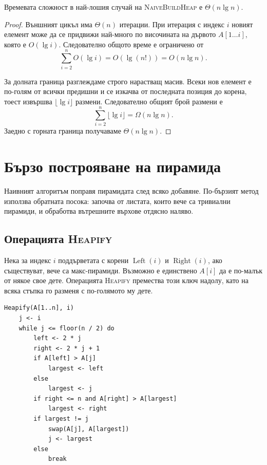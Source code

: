 \begin{thm}
Времевата сложност в най-лошия случай на \textsc{NaiveBuildHeap} е $\Theta(n\lg n)$.
\end{thm}

\begin{proof}
Външният цикъл има $\Theta(n)$ итерации. При итерация с индекс $i$ новият елемент може да се придвижи най-много по височината на дървото $A[1\ldots i]$, която е $O(\lg i)$. Следователно общото време е ограничено от
\[
\sum_{i=2}^{n} O(\lg i)=O(\lg(n!))=O(n\lg n).
\]

За долната граница разглеждаме строго нарастващ масив. Всеки нов елемент е по-голям от всички предишни и се изкачва от последната позиция до корена, тоест извършва $\lfloor\lg i\rfloor$ размени. Следователно общият брой размени е
\[
\sum_{i=2}^{n}\lfloor\lg i\rfloor=\Omega(n\lg n).
\]
Заедно с горната граница получаваме $\Theta(n\lg n)$.
\end{proof}

\section{Бързо построяване на пирамида}\label{s:6.4}

Наивният алгоритъм поправя пирамидата след всяко добавяне. По-бързият метод използва обратната посока: започва от листата, които вече са тривиални пирамиди, и обработва вътрешните върхове отдясно наляво.

\subsection{Операцията \textsc{Heapify}}\label{s:6.4.1}

Нека за индекс $i$ поддърветата с корени $\operatorname{Left}(i)$ и $\operatorname{Right}(i)$, ако съществуват, вече са макс-пирамиди. Възможно е единствено $A[i]$ да е по-малък от някое свое дете. Операцията \textsc{Heapify} премества този ключ надолу, като на всяка стъпка го разменя с по-голямото му дете.

\begin{verbatim}
Heapify(A[1..n], i)
    j <- i
    while j <= floor(n / 2) do
        left <- 2 * j
        right <- 2 * j + 1
        if A[left] > A[j]
            largest <- left
        else
            largest <- j
        if right <= n and A[right] > A[largest]
            largest <- right
        if largest != j
            swap(A[j], A[largest])
            j <- largest
        else
            break
\end{verbatim}

